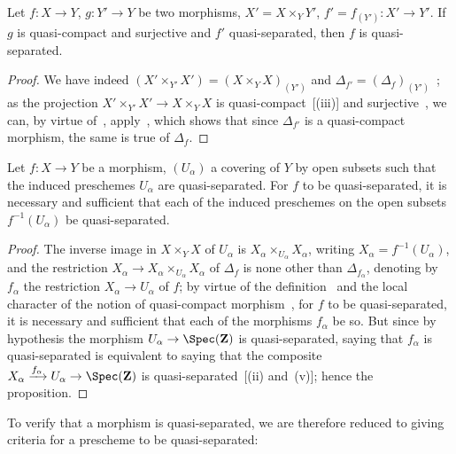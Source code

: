 \begin{proposition}[1.2.5]
\label{IV.1.2.5}
Let $f:X\to Y$, $g:Y'\to Y$ be two morphisms, $X'=X\times_Y Y'$,
$f'=f_{(Y')}:X'\to Y'$. If $g$ is quasi-compact and surjective and $f'$ quasi-separated, then $f$ is
quasi-separated.
\end{proposition}

\begin{proof}
We have indeed $(X'\times_{Y'} X')=(X\times_Y X)_{(Y')}$ and $\Delta_{f'}=(\Delta_f)_{(Y')}$~; as the
projection $X'\times_{Y'} X'\to X\times_Y X$ is quasi-compact~[(iii)] and surjective~,
we can, by virtue of~, apply~, which shows that since $\Delta_{f'}$ is
a quasi-compact morphism, the same is true of $\Delta_f$.
\end{proof}

\begin{proposition}[1.2.6]
\label{IV.1.2.6}
Let $f:X\to Y$ be a morphism, $(U_\alpha)$ a covering of $Y$
by open subsets such that the induced preschemes $U_\alpha$ are quasi-separated. For $f$ to be quasi-separated, it is necessary and sufficient that each of the induced preschemes on the open subsets $f^{-1}(U_\alpha)$ be
quasi-separated.
\end{proposition}

\begin{proof}
The inverse image in $X\times_Y X$ of $U_\alpha$ is $X_\alpha\times_{U_\alpha} X_\alpha$, writing $X_\alpha=f^{-1}(U_\alpha)$,
and the restriction $X_\alpha\to X_\alpha\times_{U_\alpha} X_\alpha$ of $\Delta_f$ is none other than $\Delta_{f_\alpha}$, denoting by $f_\alpha$ the restriction
$X_\alpha\to U_\alpha$ of $f$; by virtue of the definition~ and the local character of the notion of
quasi-compact morphism~, for $f$ to be quasi-separated, it is necessary and sufficient that
each of the morphisms $f_\alpha$ be so. But since by hypothesis the morphism $U_\alpha\to\Spec(\mathbf{Z})$
is quasi-separated, saying that $f_\alpha$ is quasi-separated is equivalent to saying that the composite
$X_\alpha\xrightarrow{f_\alpha} U_\alpha\to\Spec(\mathbf{Z})$ is quasi-separated~[(ii) and~(v)];
hence the proposition.
\end{proof}


To verify that a morphism is quasi-separated, we are therefore reduced to giving
criteria for a prescheme to be quasi-separated:


